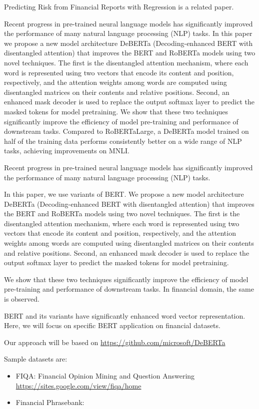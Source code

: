 \documentclass[11pt]{article}
\begin{document}
Predicting Risk from Financial Reports with Regression
is a related paper.


Recent progress in pre-trained neural language models has significantly improved the performance of many natural language processing (NLP) tasks. In this paper we
propose a new model architecture DeBERTa (Decoding-enhanced BERT with disentangled attention) that improves the BERT and RoBERTa models using two novel
techniques. The first is the disentangled attention mechanism, where each word is represented using two vectors that encode its content and position, respectively,
and the attention weights among words are computed using disentangled
matrices on their contents and relative positions. Second, an enhanced mask decoder is used
to replace the output softmax layer to predict the masked tokens for model pretraining. We show that these two techniques significantly improve the efficiency of
model pre-training and performance of downstream tasks. Compared to RoBERTaLarge, a DeBERTa model trained on half of the training data performs consistently
better on a wide range of NLP tasks, achieving improvements on MNLI.

Recent progress in pre-trained neural language models has significantly improved the performance of many natural language processing (NLP) tasks.

In this paper, we use variants of BERT. We propose a new model
architecture DeBERTa (Decoding-enhanced BERT with disentangled
attention) that improves the BERT and RoBERTa models using two novel techniques. The first is the disentangled attention mechanism, where each word is represented using two vectors that encode its content and position, respectively,
and the attention weights among words are computed using disentangled
matrices on their contents and relative positions. Second, an enhanced mask decoder is used
to replace the output softmax layer to predict the masked tokens for
model pretraining.

We show that these two techniques significantly improve the efficiency of
model pre-training and performance of downstream tasks. In financial
domain, the same is observed.



BERT and its variants have significantly enhanced word vector
representation. Here, we will focus on specific BERT application on financial
datasets.

Our approach will be based on \url{https://github.com/microsoft/DeBERTa}

Sample datasets are:
\begin{itemize}
\item FIQA: Financial Opinion Mining and Question Answering \url{https://sites.google.com/view/fiqa/home}
\vspace{0.1cm}
\item Financial Phrasebank:
\end{itemize}
\end{document}
